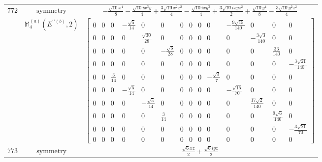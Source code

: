 \documentclass[fleqn,8pt,landscape]{jsarticle}
\begin{document}
\begin{longtable}{ccc}
$ 772 $ & $ \text{symmetry} $ & $ - \frac{\sqrt{10} x^{4}}{8} - \frac{\sqrt{10} i x^{3} y}{4} + \frac{3 \sqrt{10} x^{2} z^{2}}{4} - \frac{\sqrt{10} i x y^{3}}{4} + \frac{3 \sqrt{10} i x y z^{2}}{2} + \frac{\sqrt{10} y^{4}}{8} - \frac{3 \sqrt{10} y^{2} z^{2}}{4} $ \\
$  $ & $ \mathbb{M}_{4}^{(a)}(E^{\prime\prime(b)},2) $ & $ \begin{bmatrix} 0 & 0 & 0 & - \frac{\sqrt{5}}{14} & 0 & 0 & 0 & 0 & 0 & 0 & - \frac{9 \sqrt{15}}{140} & 0 & 0 & 0 \\ 0 & 0 & 0 & 0 & \frac{\sqrt{30}}{28} & 0 & 0 & 0 & 0 & 0 & 0 & - \frac{3 \sqrt{3}}{140} & 0 & 0 \\ 0 & 0 & 0 & 0 & 0 & - \frac{\sqrt{6}}{28} & 0 & 0 & 0 & 0 & 0 & 0 & \frac{33}{140} & 0 \\ 0 & 0 & 0 & 0 & 0 & 0 & 0 & 0 & 0 & 0 & 0 & 0 & 0 & - \frac{3 \sqrt{21}}{140} \\ 0 & 0 & \frac{3}{14} & 0 & 0 & 0 & 0 & 0 & 0 & - \frac{\sqrt{3}}{7} & 0 & 0 & 0 & 0 \\ 0 & 0 & 0 & - \frac{\sqrt{5}}{14} & 0 & 0 & 0 & 0 & 0 & 0 & - \frac{\sqrt{15}}{70} & 0 & 0 & 0 \\ 0 & 0 & 0 & 0 & - \frac{\sqrt{5}}{14} & 0 & 0 & 0 & 0 & 0 & 0 & \frac{17 \sqrt{2}}{140} & 0 & 0 \\ 0 & 0 & 0 & 0 & 0 & \frac{3}{14} & 0 & 0 & 0 & 0 & 0 & 0 & \frac{9 \sqrt{6}}{140} & 0 \\ 0 & 0 & 0 & 0 & 0 & 0 & 0 & 0 & 0 & 0 & 0 & 0 & 0 & - \frac{3 \sqrt{21}}{70} \\ 0 & 0 & 0 & 0 & 0 & 0 & 0 & 0 & 0 & 0 & 0 & 0 & 0 & 0 \end{bmatrix} $ \\ \hline
$ 773 $ & $ \text{symmetry} $ & $ \frac{\sqrt{6} x z}{2} + \frac{\sqrt{6} i y z}{2} $ \\

\end{longtable}
\end{document}
